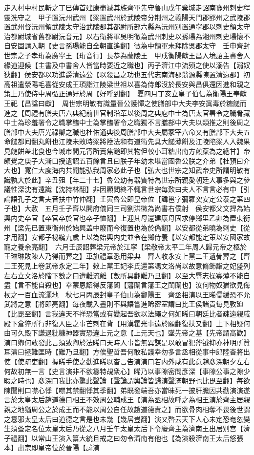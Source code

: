 走入村中村民斬之丁巳傳首建康盡滅其族齊軍先守魯山戊午棄城走詔南豫州刺史程靈洗守之　甲子置沅州武州【梁置武州於武陵帝分荆州之義陽天門郡郢州之武陵郡置武州督沅州領武陵太守治武陵郡其都尉所部六縣為沅州别置通寜郡以刺史領太守治都尉城省舊都尉沅音元】以右衛將軍吳明徹為武州刺史以孫瑒為湘州刺史瑒懷不自安固請入朝【史言孫瑒能自全朝直遙翻】徵為中領軍未拜除吳郡太守　壬申齊封世宗之子孝珩為廣寜王【珩音行】長恭為蘭陵王　甲戌衡陽獻王昌入境詔主書舍人緣道迎候【主書及中書舍人皆當時要近之職也】丙子濟江中流殞之使以溺告【溺奴狄翻】侯安都以功進爵清遠公【以殺昌之功也五代志南海郡翁源縣陳置清遠郡】初高祖遣滎陽毛喜從安成王頊詣江陵梁世祖以喜為侍郎沒於長安與昌俱還因進和親之策上乃使侍中周弘正通好於周【好呼到翻】　夏四月丁亥立皇子伯信為衡陽王奉獻王祀【昌諡曰獻】　周世宗明敏有識量晉公護憚之使膳部中大夫李安寘毒於糖䭔而進之【周禮有膳夫唐六典紀前世官制沿革以後周之典庖中士為唐太官署令之職肴藏中士為珍羞署令之職掌醢中士為掌醢署令之職獨不言膳部中大夫以類推之則後周之膳部中大夫唐光祿卿之職也杜佑通典後周膳部中大夫屬冢宰六命又有膳部下大夫五命䭔都囘翻丸餅也江陵未敗時梁將陸法和有道術先具大䭔薄餅及江陵陷梁人入魏果見䭔餅盖北食也今城市間元宵所賣焦䭔即其物但較小耳糖出南方煎蔗為之絶甘】帝頗覺之庚子大漸口授遺詔五百餘言且曰朕子年幼未堪當國魯公朕之介弟【杜預曰介大也】寛仁大度海内共聞能弘我周家必此子也【弘大也世宗之知武帝史所謂明敏有識孰大於此】辛丑殂【年二十七】魯公幼有器質特為世宗所親愛朝廷大事多與之參議性深沈有遠識【沈持林翻】非因顧問終不輒言世宗每歎曰夫人不言言必有中【引論語孔子之言夫音扶中竹仲翻】壬寅魯公即皇帝位【諱邕字彌羅突安定公泰之第四子也】大赦　五月壬子齊以開府儀同三司劉洪徽為尚書右僕射　侯安都父文捍為始興内史卒官【卒官卒於官也卒子恤翻】上迎其母還建康母固求停鄉里乙卯為置東衡州【梁先已置東衡州於始興盖中廢而今復置也為於偽翻】以安都從弟曉為刺史【從才用翻】安都子袐纔九歲上以為始興内史並令在鄉侍養【以安都能定策以安國家故寵之養余亮翻】　六月壬辰詔葬梁元帝於江寜【梁敬帝太平二年周人歸元帝之柩於王琳琳敗陳人乃得而葬之】車旗禮章悉用梁典　齊人收永安上黨二王遺骨葬之【齊二王死見上卷武帝永定二年】敕上黨王妃李氏還第馮文洛尚以故意脩飾詣之妃盛列左右立文洛於階下數之曰遭難流離【數所具翻難乃旦翻】以至大辱志操寡薄不能自盡【言不能自殺也】幸蒙恩詔得反藩闈【藩闈言藩王之閨闈也】汝何物奴猶欲見侮杖之一百血流灑地　秋七月丙辰封皇子伯山為鄱陽王　齊丞相演以王晞儒緩恐不允武將之意【將即亮翻】每夜載入晝則不與語嘗進晞密室謂曰比王侯諸貴每見敦廹【比毘至翻】言我違天不祥恐當或有變起吾欲以法繩之何如晞曰朝廷比者疎遠親戚殿下倉猝所行非復人臣之事芒刺在背【用漢霍光事遠於願翻復扶又翻】上下相疑何由可久殿下謙退粃糠神器實恐違上元之意【上元天也】墜先帝之基【先帝謂高歡】演曰卿何敢發此言須致卿於法晞曰天時人事皆無異謀是以敢冒犯斧钺抑亦神明所贊耳演曰拯難匡時【難乃旦翻】方俟聖哲吾何敢私議幸勿多言丞相從事中郎陸杳將出使【使疏吏翻】握晞手使之勸進晞以杳言告演演曰若内外咸有此意趙彥深朝夕左右何故初無一言【史言演非不欲簒特覘衆心】晞乃以事隙密問彥深【事隙公事之隙少暇之時也】彥深曰我比亦驚此聲論【聲論謂輿論皆歸演聲滿朝野也比毘至翻】每欲陳聞則口噤心悸【噤其禁翻悸其季翻】弟既發端吾亦當昧死一披肝膽因共勸演演遂言於太皇太后趙道德曰相王不效周公輔成王【演為丞相故呼之為相王演於齊主居親親之地猶周公之於成王而不能以周公自任故趙道德責之】而欲骨肉相奪不畏後世謂之簒邪太皇太后曰道德之言是也未幾【幾居豈翻】演又啓云天下人心未定恐奄忽變生須蚤定名位太皇太后乃從之八月壬午太皇太后下令廢齊主為濟南王出居别宫【濟子禮翻】以常山王演入纂大統且戒之曰勿令濟南有他也【為演殺濟南王太后怒張本】肅宗即皇帝位於晉陽【諱演